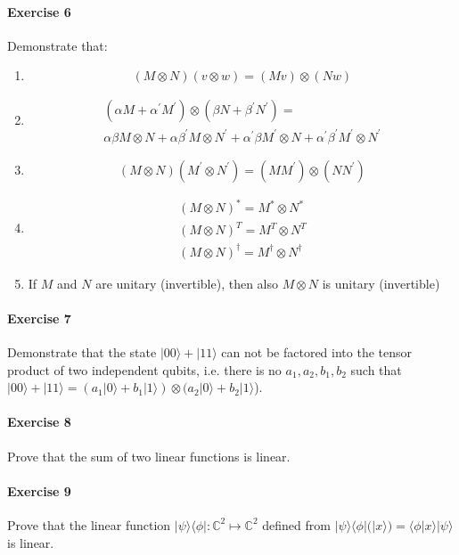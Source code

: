 \documentclass[a4paper,10pt]{article}
\begin{document}
\paragraph{Exercise 6}
\label{ex06q}
Demonstrate that:
\begin{enumerate}
    \item $$(M \otimes N) (v \otimes w) = (Mv)\otimes(Nw)$$
    \item
    \begin{equation*}
    \begin{split}
    (\alpha M + \alpha^{'} M^{'}) \otimes (\beta N + \beta^{'} N^{'}) = \\
    \alpha \beta M \otimes N + \alpha \beta^{'} M \otimes N^{'} + \alpha^{'} \beta M^{'} \otimes N + \alpha^{'} \beta^{'} M^{'} \otimes N^{'}
    \end{split}
    \end{equation*}
    \item $$(M \otimes N) (M^{'} \otimes N^{'}) = (MM^{'})\otimes(NN^{'})$$
    \item
    \begin{equation*}
    \begin{split}
    (M \otimes N)^{*} = M^{*} \otimes N^{*} \\
    (M \otimes N)^{T} = M^{T} \otimes N^{T} \\
    (M \otimes N)^{\dagger} = M^{\dagger} \otimes N^{\dagger} \end{split}
    \end{equation*}
    \item If $M$ and $N$ are unitary (invertible), then also $M \otimes N$ is unitary (invertible)
\end{enumerate}
\paragraph{Exercise 7}
\label{ex07q}
Demonstrate that the state $|00\rangle + |11\rangle$ can not be factored into the tensor product of two independent qubits, i.e. there is no $a_1, a_2, b_1, b_2$ such that $|00\rangle + |11\rangle = (a_1 |0\rangle + b_1 |1\rangle) \otimes (a_2 |0\rangle + b_2 |1\rangle$).
\paragraph{Exercise 8}
\label{ex08q}
Prove that the sum of two linear functions is linear.
\paragraph{Exercise 9}
\label{ex09q}
Prove that the linear function $|\psi\rangle\langle\phi| : \mathbb{C}^2 \mapsto \mathbb{C}^2$ defined from $|\psi\rangle\langle\phi|(|x\rangle) = \langle\phi|x\rangle|\psi\rangle$ is linear.
\end{document}
